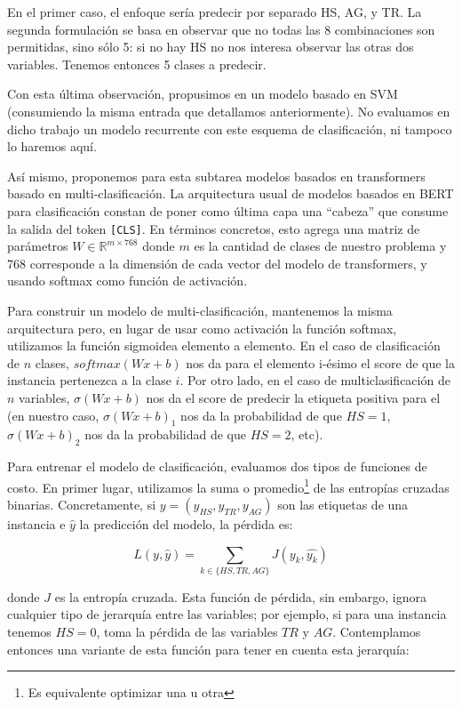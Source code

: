 En el primer caso, el enfoque sería predecir por separado HS, AG, y TR. La segunda formulación se basa en observar que no todas las 8 combinaciones son permitidas, sino sólo 5: si no hay HS no nos interesa observar las otras dos variables. Tenemos entonces 5 clases a predecir.

Con esta última observación, propusimos en \citet{atalaya_tass2018} un modelo basado en SVM (consumiendo la misma entrada que detallamos anteriormente). No evaluamos en dicho trabajo un modelo recurrente con este esquema de clasificación, ni tampoco lo haremos aquí.

Así mismo, proponemos para esta subtarea modelos basados en transformers basado en multi-clasificación. La arquitectura usual de modelos basados en BERT para clasificación constan de poner como última capa una  ``cabeza'' que consume la salida del token \verb|[CLS]|. En términos concretos, esto agrega una matriz de parámetros $W \in \mathbb{R}^{m \times 768}$ donde $m$ es la cantidad de clases de nuestro problema y 768 corresponde a la dimensión de cada vector del modelo de transformers, y usando softmax como función de activación.

Para construir un modelo de multi-clasificación, mantenemos la misma arquitectura pero, en lugar de usar como activación la función softmax, utilizamos la función sigmoidea elemento a elemento. En el caso de clasificación de $n$ clases, $softmax(W x + b)$ nos da para el elemento i-ésimo el score de que la instancia pertenezca a la clase $i$. Por otro lado, en el caso de multiclasificación de $n$ variables, $\sigma(W x + b)$ nos da el score de predecir la etiqueta positiva para el (en nuestro caso,  $\sigma(W x + b)_1$ nos da la probabilidad de que $HS = 1$,  $\sigma(W x + b)_2$ nos da la probabilidad de que $HS = 2$, etc).

Para entrenar el modelo de clasificación, evaluamos dos tipos de funciones de costo. En primer lugar, utilizamos la suma o promedio\footnote{Es equivalente optimizar una u otra} de las entropías cruzadas binarias. Concretamente, si $y = (y_{HS}, y_{TR}, y_{AG})$ son las etiquetas de una instancia e $\widehat{y}$ la predicción del modelo, la pérdida es:

\begin{equation}
L(y, \widehat{y}) = \sum\limits_{k \in \{HS, TR, AG\}} J(y_k, \widehat{y_k})
\end{equation}

donde $J$ es la entropía cruzada. Esta función de pérdida, sin embargo, ignora cualquier tipo de jerarquía entre las variables; por ejemplo, si para una instancia tenemos $HS = 0$, toma la pérdida de las variables $TR$ y $AG$. Contemplamos entonces una variante de esta función para tener en cuenta esta jerarquía:

